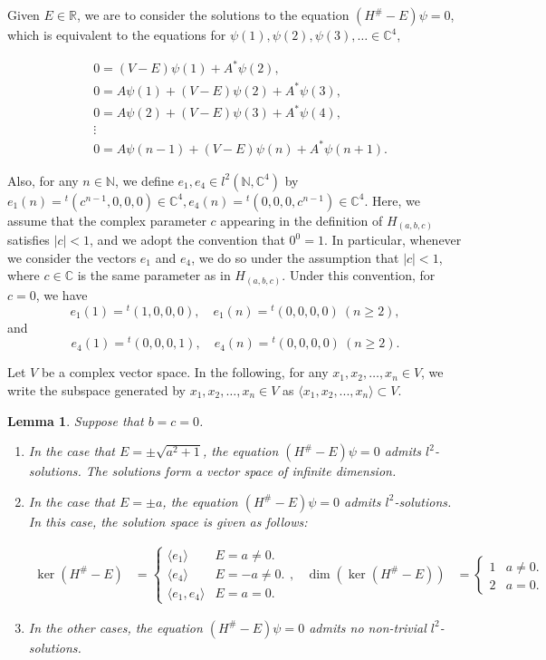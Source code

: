 \documentclass{amsart}
\newtheorem{lem}[thm]{Lemma}
\theoremstyle{definition}
\theoremstyle{remark}
\begin{document}
Given $E\in \mathbb{R}$, we are to consider the solutions to the equation $(H^{\#}-E)\psi=0$,
which is equivalent to the equations for $\psi(1), \psi(2), \psi(3),\ldots \in \mathbb{C}^4,$

\begin{align*}
   &0=(V-E)\psi(1)+A^*\psi(2),\\
   &0=A\psi(1)+(V-E)\psi(2)+A^*\psi(3),\\
   &0=A\psi(2)+(V-E)\psi(3)+A^*\psi(4),\\
   &\vdots \\
   &0=A\psi(n-1)+(V-E)\psi(n)+A^*\psi(n+1).
  \end{align*}

   Also, for any $n\in \mathbb{N}$, we define $e_1, e_4\in l^2(\mathbb{N}, \mathbb{C}^4)$ by 
  $e_1(n) = {}^t\! (c^{n-1},0,0,0)\in \mathbb{C}^4,e_4(n) = {}^t\! (0,0,0,c^{n-1})\in \mathbb{C}^4.$
 Here, we assume that the complex parameter \( c \) appearing in the definition of \( H_{(a, b, c)} \) satisfies \( |c| < 1 \), and we adopt the convention that \( 0^0 = 1 \). In particular, whenever we consider the vectors \( e_1 \) and \( e_4 \), we do so under the assumption that \( |c| < 1 \), where \( c \in \mathbb{C} \) is the same parameter as in \( H_{(a, b, c)} \). Under this convention, for \( c = 0 \), we have
\[
e_1(1) = {}^t\!(1, 0, 0, 0), \quad e_1(n) = {}^t\!(0, 0, 0, 0) \ (n \geq 2),
\]
and
\[
e_4(1) = {}^t\!(0, 0, 0, 1), \quad e_4(n) = {}^t\!(0, 0, 0, 0) \ (n \geq 2).
\]

 Let $V$ be a complex vector space. In the following, for any $x_1, x_2,\ldots, x_n\in V$, we write the subspace generated by $x_1, x_2,\ldots, x_n\in V$ as $\langle x_1,x_2,...,x_n \rangle \subset V.$

   \begin{lem}\label{lem:6.1}
Suppose that $b=c=0$.

\begin{enumerate}
\item In the case that $E=\pm \sqrt{a^2+1}$, the equation $(H^{\#}-E)\psi=0$ admits $l^2$-solutions. The solutions form a vector space of infinite dimension.

\item  In the case that $E=\pm a$, the equation $(H^{\#}-E)\psi =0$ admits $l^2$-solutions. In this case, the solution space is given as follows:

\begin{align*}
\ker(H^\#-E)&=
\begin{cases}
	\langle e_1\rangle& E=a\neq 0.\\ 
	\langle e_4\rangle& E=-a\neq 0.\\ 
	\langle e_1,e_4\rangle& E=a=0.
\end{cases}
,&\dim(\ker(H^\#-E))&=
\begin{cases}
	1& a\neq 0.\\ 
	2& a=0.
\end{cases}
\end{align*}

\item In the other cases, the equation $(H^{\#}-E)\psi =0$ admits no non-trivial $l^2$-solutions.
\end{enumerate}
\end{lem}
\end{document}

